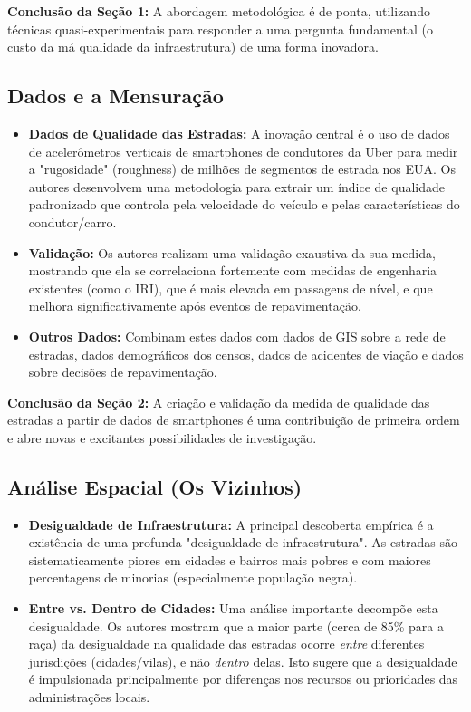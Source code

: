 \documentclass[12pt, a4paper]{article}
\begin{document}
\noindent\textbf{Conclusão da Seção 1:} A abordagem metodológica é de ponta, utilizando técnicas quasi-experimentais para responder a uma pergunta fundamental (o custo da má qualidade da infraestrutura) de uma forma inovadora.

\subsection{Dados e a Mensuração}

\begin{itemize}
    \item \textbf{Dados de Qualidade das Estradas:} A inovação central é o uso de dados de acelerômetros verticais de smartphones de condutores da Uber para medir a "rugosidade" (roughness) de milhões de segmentos de estrada nos EUA. Os autores desenvolvem uma metodologia para extrair um índice de qualidade padronizado que controla pela velocidade do veículo e pelas características do condutor/carro.
    \item \textbf{Validação:} Os autores realizam uma validação exaustiva da sua medida, mostrando que ela se correlaciona fortemente com medidas de engenharia existentes (como o IRI), que é mais elevada em passagens de nível, e que melhora significativamente após eventos de repavimentação.
    \item \textbf{Outros Dados:} Combinam estes dados com dados de GIS sobre a rede de estradas, dados demográficos dos censos, dados de acidentes de viação e dados sobre decisões de repavimentação.
\end{itemize}

\noindent\textbf{Conclusão da Seção 2:} A criação e validação da medida de qualidade das estradas a partir de dados de smartphones é uma contribuição de primeira ordem e abre novas e excitantes possibilidades de investigação.

\subsection{Análise Espacial (Os Vizinhos)}

\begin{itemize}
    \item \textbf{Desigualdade de Infraestrutura:} A principal descoberta empírica é a existência de uma profunda "desigualdade de infraestrutura". As estradas são sistematicamente piores em cidades e bairros mais pobres e com maiores percentagens de minorias (especialmente população negra).
    \item \textbf{Entre vs. Dentro de Cidades:} Uma análise importante decompõe esta desigualdade. Os autores mostram que a maior parte (cerca de 85\% para a raça) da desigualdade na qualidade das estradas ocorre \textit{entre} diferentes jurisdições (cidades/vilas), e não \textit{dentro} delas. Isto sugere que a desigualdade é impulsionada principalmente por diferenças nos recursos ou prioridades das administrações locais.
\end{itemize}
\end{document}
